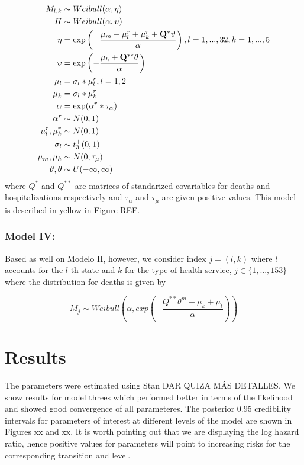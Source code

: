 \documentclass[10pt,letterpaper]{article}
\begin{document}
\[
\begin{aligned}
 M_{l,k}   &\sim Weibull(\alpha,\mathbf{\eta})\\
 H  &\sim Weibull(\alpha,\mathbf{\upsilon}) \\
 \mathbf{\eta} &= \exp \left(-\frac{\mu_m+\mathbf{\mu}_l^r+\mathbf{\mu}_k^r+\mathbf{Q}^*\mathbf{\vartheta}}{\alpha} \right),\space\space l=1,...,32,\space k=1,...,5\\
 \mathbf{\upsilon} &= \exp\left(-\frac{\mu_h+\mathbf{Q}^{**}\mathbf{\theta}}{\alpha}\right) \\
  \mathbf{\mu}_l&=\sigma_l*\mathbf{\mu}_l^r, \space\space l=1,2 \\
 \mathbf{\mu}_k&=\sigma_l*\mathbf{\mu}_k^r \\
 \alpha&=\exp(\alpha^r*\tau_\alpha) \\
 \alpha^r&\sim N(0,1) \\
 \mu^r_l,\mu^r_k &\sim N(0,1) \\
 \sigma_l&\sim t^+_3(0,1) \\
 \mu_m,\mu_h &\sim N(0,\tau_\mu) \\
 \mathbf{\vartheta},\mathbf{\theta} &\sim U(-\infty,\infty) \\
\end{aligned}
\] where \(Q^*\) and \(Q^{**}\) are matrices of standarized covariables
for deaths and hospitalizations respectively and \(\tau_\alpha\) and
\(\tau_{\mu}\) are given positive values. This model is described in
yellow in Figure REF.

\hypertarget{model-iv}{%
\subsubsection{Model IV:}\label{model-iv}}

Based as well on Modelo II, however, we consider index \(j=(l,k)\) where
\(l\) accounts for the \(l\)-th state and \(k\) for the type of health
service, \(j \in \{1,...,153\}\) where the distribution for deaths is
given by

\[M_j \sim Weibull\left(\alpha, exp\left(-\frac{Q^{**}\theta^m+\mu_k+\mu_l}{\alpha} \right) \right)\]

\hypertarget{results}{%
\section{Results}\label{results}}

The parameters were estimated using Stan DAR QUIZA MÁS DETALLES. We show
results for model threes which performed better in terms of the
likelihood and showed good convergence of all parameteres. The posterior
0.95 credibility intervals for parameters of interest at different
levels of the model are shown in Figures xx and xx. It is worth pointing
out that we are displaying the log hazard ratio, hence positive values
for parameters will point to increasing risks for the corresponding
transition and level.
\end{document}
